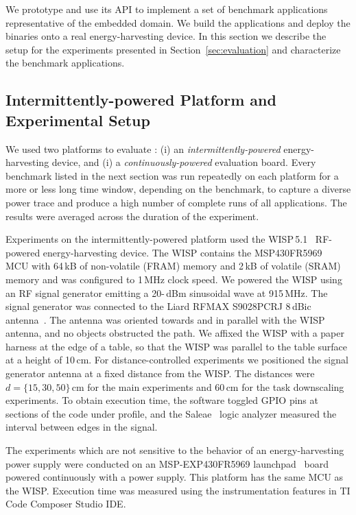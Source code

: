 We prototype \sys and use its API to implement a set of benchmark
applications representative of the embedded domain. We build the applications
and deploy the binaries onto a real energy-harvesting device. In this section
we describe the setup for the experiments presented in
Section~\ref{sec:evaluation} and characterize the benchmark applications.

\subsection{Intermittently-powered Platform and Experimental Setup}
\label{sec:results_hardware_software}

We used two platforms to evaluate \sys: (i) an \emph{intermittently-powered}
energy-harvesting device, and (i) a \emph{continuously-powered} evaluation
board.
%
Every benchmark listed in the next section was run repeatedly on
each platform for a more or less long time window, depending on the benchmark,
to capture a diverse power trace and produce a high number of complete runs of all applications.
The results were averaged across the duration of the experiment.

Experiments on the intermittently-powered platform used the
WISP\,5.1~\cite{wisp5,wisp} RF-powered energy-harvesting device.
%
The WISP contains the MSP430FR5969~\cite{wolverine} MCU with 64\,kB of
non-volatile (FRAM) memory and 2\,kB of volatile (SRAM) memory and was
configured to 1\,MHz clock speed.
%
We powered the WISP using an RF signal generator emitting  a 20-\,dBm sinusoidal wave at 915\,MHz.
The signal generator was connected to the Liard RFMAX S9028PCRJ 8\,dBic
antenna~\cite{atlas2015}.
%
The antenna was oriented towards and in parallel with the WISP antenna, and
no objects obstructed the path.
%
We affixed the WISP with a paper harness at the edge of a table, so that the
WISP was parallel to the table surface at a height of 10\,cm.
%
For distance-controlled experiments we positioned the signal generator
antenna at a fixed distance from the WISP. The distances were $d=\{15, 30,
50\}$\,cm for the main experiments and 60\,cm for the task downscaling
experiments.
%
To obtain execution time, the software toggled GPIO pins at sections of the code
under profile, and the Saleae~\cite{saleae} logic analyzer measured
the interval between edges in the signal.

The experiments which are not sensitive to the behavior of an
energy-harvesting power supply were conducted on an MSP-EXP430FR5969
launchpad~\cite{MSP-EXP430FR5969_launchpad} board powered continuously with a
power supply.
%
This platform has the same MCU as the WISP.
%
Execution time was measured using the instrumentation features in TI Code
Composer Studio IDE.
%

